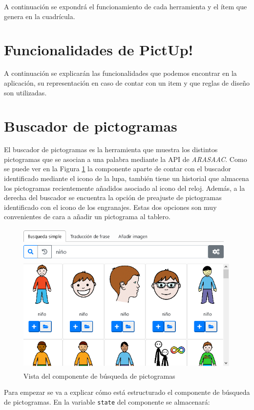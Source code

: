 A continuación se expondrá el funcionamiento de cada herramienta y el ítem que genera en la cuadrícula.

\section*{Funcionalidades de PictUp!}

A continuación se explicarán las funcionalidades que podemos encontrar en la aplicación, su representación en caso de contar con un item y que reglas de diseño son utilizadas.

\section{Buscador de pictogramas}

El buscador de pictogramas es la herramienta que muestra los distintos pictogramas que se asocian a una palabra mediante la API de \textit{ARASAAC}. Como se puede ver en la Figura \ref{fig:buscarpicto2} la componente aparte de contar con el buscador identificado mediante el icono de la lupa, también tiene un historial que almacena los pictogramas recientemente añadidos asociado al icono del reloj. Además, a la derecha del buscador se encuentra la opción de preajuste de pictogramas identificado con el icono de los engranajes. Estas dos opciones son muy convenientes de cara a añadir un pictograma al tablero. 


\begin{figure}[h!]
	\centering
	\includegraphics[width=0.7\linewidth]{Imagenes/Bitmap/buscarPicto2}
	\caption{Vista del componente de búsqueda de pictogramas}
	\label{fig:buscarpicto2}
\end{figure}


Para empezar se va a explicar cómo está estructurado el componente de búsqueda de pictogramas. En la variable \texttt{state} del componente se almacenará:

